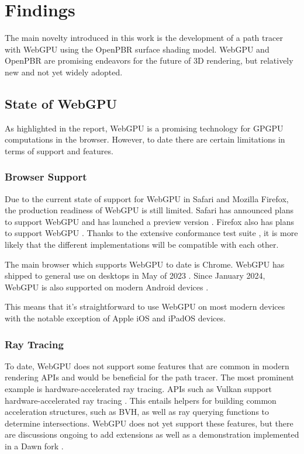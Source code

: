 \section{Findings}

The main novelty introduced in this work is the development of a path tracer with \gls{WebGPU} using the \gls{OpenPBR} surface shading model. \gls{WebGPU} and \gls{OpenPBR} are promising endeavors for the future of 3D rendering, but relatively new and not yet widely adopted.

\subsection*{State of WebGPU}

As highlighted in the report, \gls{WebGPU} is a promising technology for \gls{GPGPU} computations in the browser. However, to date there are certain limitations in terms of support and features.

\subsubsection*{Browser Support}

Due to the current state of support for \gls{WebGPU} in Safari and Mozilla Firefox, the production readiness of \gls{WebGPU} is still limited. Safari has announced plans to support \gls{WebGPU} and has launched a preview version \cite{SafariWebGPUSupport}. Firefox also has plans to support WebGPU \cite{FirefoxWebGPUSupport}. Thanks to the extensive conformance test suite \cite{WebGPUConformanceTestSuite}, it is more likely that the different implementations will be compatible with each other.

The main browser which supports \gls{WebGPU} to date is Chrome. \gls{WebGPU} has shipped to general use on desktops in May of 2023 \cite{ChromeWebGPUSupport}. Since January 2024, \gls{WebGPU} is also supported on modern Android devices \cite{ChromeAndroidWebGPUSupport}.

This means that it's straightforward to use \gls{WebGPU} on most modern devices with the notable exception of Apple iOS and iPadOS devices.

\subsubsection*{Ray Tracing}

To date, \gls{WebGPU} does not support some features that are common in modern rendering \glspl{API} and would be beneficial for the path tracer. The most prominent example is hardware-accelerated ray tracing. \glspl{API} such as Vulkan support hardware-accelerated ray tracing \cite{vulkanRayTracing}. This entails helpers for building common acceleration structures, such as \gls{BVH}, as well as ray querying functions to determine intersections. \gls{WebGPU} does not yet support these features, but there are discussions ongoing to add extensions \cite{webGPURayTracing} as well as a demonstration implemented in a Dawn fork \cite{webGPURayTracingFork}.

